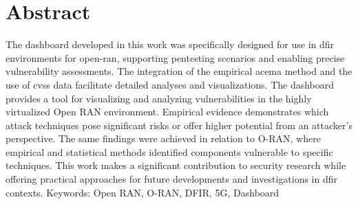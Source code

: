 \chapter*{Abstract}
\label{chap:abstract}
The dashboard developed in this work was specifically designed for use in \gls{dfir} environments for \gls{open-ran}, supporting pentesting scenarios and enabling precise vulnerability assessments. The integration of the empirical \gls{acema} method and the use of \gls{cvss} data facilitate detailed analyses and visualizations. The dashboard provides a tool for visualizing and analyzing vulnerabilities in the highly virtualized Open RAN environment. Empirical evidence demonstrates which attack techniques pose significant risks or offer higher potential from an attacker{’}s perspective. The same findings were achieved in relation to O-RAN, where empirical and statistical methods identified components vulnerable to specific techniques. This work makes a significant contribution to security research while offering practical approaches for future developments and investigations in \gls{dfir} contexts.
Keywords: Open RAN, O-RAN, DFIR, 5G, Dashboard